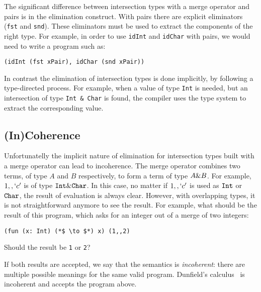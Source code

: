 \noindent The significant difference between intersection types with a
merge operator and pairs is in the elimination construct. With pairs
there are explicit eliminators (\lstinline{fst} and
\lstinline{snd}). These eliminators must be used to extract the
components of the right type. For example, in order to use
\lstinline{idInt} and \lstinline{idChar} with pairs, we would need to
write a program such as:

\begin{lstlisting}
(idInt (fst xPair), idChar (snd xPair))
\end{lstlisting}

\noindent In contrast the elimination of intersection types is done
implicitly, by following a type-directed process. For example,
when a value of type \lstinline{Int} is needed, but an intersection
of type \lstinline{Int & Char} is found, the compiler uses the
type system to extract the corresponding value.

\subsection{(In)Coherence}\label{subsec:incoherence}
Unfortunatelly the implicit nature of elimination for intersection
types built with a merge operator can lead to incoherence.
The merge operator combines two terms, of type $A$ and $B$
respectively, to form a term of type $A \& B$. For example,
$1 ,, `c'$ is of type $\texttt{Int} \& \texttt{Char}$. In this case, no
matter if $1 ,, `c'$ is used as $\texttt{Int}$ or $\texttt{Char}$, the result
of evaluation is always clear. However, with overlapping types, it is
not straightforward anymore to see the result. For example, what
should be the result of this program, which asks for an integer out of
a merge of two integers:
\begin{lstlisting}
(fun (x: Int) (*$ \to $*) x) (1,,2)
\end{lstlisting}
Should the result be \lstinline$1$ or \lstinline$2$?

If both results are accepted, we say that the semantics is
\emph{incoherent}: there are multiple possible meanings for the same
valid program. 
Dunfield's calculus~\cite{dunfield2014elaborating} is incoherent and accepts the
program above.

